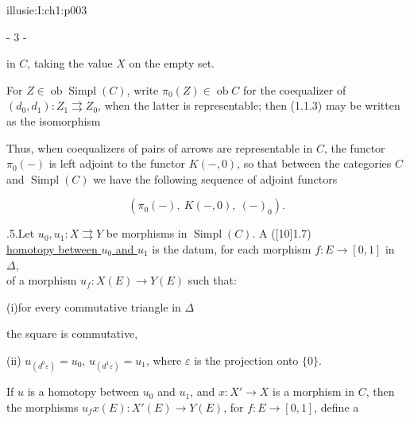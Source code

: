 \IllusieSetPhysicalPageSize{447bp}{698.6bp}
\begin{illusiebodypage}{illusie:I:ch1:p003}
\begin{center}- 3 -\end{center}
\vspace{7bp}\fontsize{9}{14}\selectfont

\hypertarget{illusie:I:ch1:s1:1:p5c1}{}%
\noindent in $C$, taking the value $X$ on the empty set.

\hypertarget{illusie:I:ch1:s1:1:p6}{}%
For $Z\in\operatorname{ob}\operatorname{Simpl}(C)$, write
$\pi_0(Z)\in\operatorname{ob}C$ for the coequalizer of\\
$(d_0,d_1):Z_1\rightrightarrows Z_0$, when the latter is representable; then
(1.1.3) may be written as the isomorphism

\hypertarget{illusie:I:ch1:s1:1:eq4}{}%
\noindent{}\par

Thus, when coequalizers of pairs of arrows are representable in $C$, the
functor $\pi_0(-)$ is left adjoint to the functor $K(-,0)$, so that between the
categories $C$ and $\operatorname{Simpl}(C)$ we have the following sequence of
adjoint functors

\hypertarget{illusie:I:ch1:s1:1:d4}{}%
\[ (\pi_0(-),\ K(-,0),\ (-)_0). \]

\hypertarget{illusie:I:ch1:s1:1:p7}{}%
.5.\quad Let $u_0,u_1:X\rightrightarrows Y$ be morphisms in
$\operatorname{Simpl}(C)$. A ([10]1.7)\\
\underline{homotopy between $u_0$ and $u_1$} is the datum, for each morphism
$f:E\longrightarrow[0,1]$ in $\Delta$,\\of a morphism
$u_f:X(E)\longrightarrow Y(E)$ such that:

\hypertarget{illusie:I:ch1:s1:1:d5}{}%
\hspace*{34bp}(i)\quad for every commutative triangle in $\Delta$
\IllusieHomotopyTriangle

\hypertarget{illusie:I:ch1:s1:1:d6}{}%
\noindent the square
\IllusieHomotopySquare
\noindent is commutative,

\hypertarget{illusie:I:ch1:s1:1:p8}{}%
\hspace*{34bp}(ii)\quad
$u_{(d^0\varepsilon)}=u_0$, $u_{(d^1\varepsilon)}=u_1$, where $\varepsilon$
is the projection onto $\{0\}$.

\hypertarget{illusie:I:ch1:s1:1:p9}{}%
If $u$ is a homotopy between $u_0$ and $u_1$, and
$x:X'\longrightarrow X$ is a morphism in $C$, then the morphisms
$u_f x(E):X'(E)\longrightarrow Y(E)$, for $f:E\longrightarrow[0,1]$, define a
\end{illusiebodypage}

